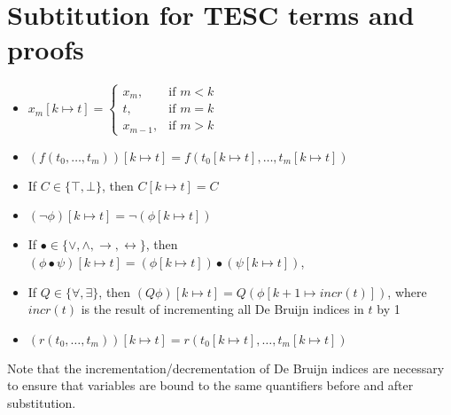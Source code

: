 \documentclass[12pt]{article}
\newcommand{\limp}[0]{\to}
\newcommand{\liff}[0]{\leftrightarrow}
\begin{document}
\section{Subtitution for TESC terms and proofs} \label{apdx:subst}

  \begin{itemize}
    \item $
      x_m [k \mapsto t] = 
      \begin{cases}
        x_m, & \text{if } m < k \\
        t, & \text{if } m = k \\
        x_{m-1}, & \text{if } m > k 
      \end{cases}
    $
    \item $(f(t_0, \ldots, t_m)) [k \mapsto t] = f(t_0[k \mapsto t], \ldots, t_m [k \mapsto t])$
    \item If $C \in \{\top, \bot\}$, then $C [k \mapsto t] = C$
    \item $(\lnot \phi) [k \mapsto t] = \lnot (\phi [k \mapsto t])$
    \item If $\bullet \in \{\lor, \land, \limp, \liff\}$, then $(\phi \bullet \psi) [k \mapsto t] = (\phi [k \mapsto t]) \bullet (\psi [k \mapsto t])$, 
    \item If $Q \in \{\forall, \exists\}$, then $(Q \phi) [k \mapsto t] = Q (\phi [k + 1 \mapsto incr(t)])$, 
      where $incr(t)$ is the result of incrementing all De Bruijn indices in $t$ by 1
    \item $(r(t_0, \ldots, t_m)) [k \mapsto t] = r(t_0[k \mapsto t], \ldots, t_m [k \mapsto t])$
  \end{itemize} 
  Note that the incrementation/decrementation of De Bruijn indices are necessary to ensure that variables are bound to the same quantifiers before and after substitution.
\end{document}
